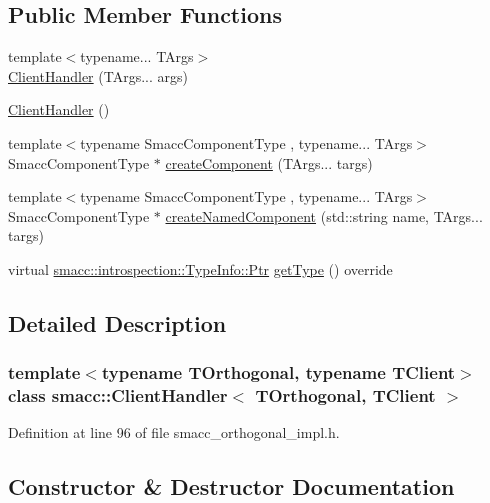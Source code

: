 \subsection*{Public Member Functions}
\begin{DoxyCompactItemize}
\item 
{\footnotesize template$<$typename... T\+Args$>$ }\\\hyperlink{classsmacc_1_1ClientHandler_a5f92ec0fcc8bf24d2d5ef6eb60e987d7}{Client\+Handler} (T\+Args... args)
\item 
\hyperlink{classsmacc_1_1ClientHandler_a73f354900b489edacad7ccb411c272da}{Client\+Handler} ()
\item 
{\footnotesize template$<$typename Smacc\+Component\+Type , typename... T\+Args$>$ }\\Smacc\+Component\+Type $\ast$ \hyperlink{classsmacc_1_1ClientHandler_a4a9adad4c37104586c9b595d9030bb3c}{create\+Component} (T\+Args... targs)
\item 
{\footnotesize template$<$typename Smacc\+Component\+Type , typename... T\+Args$>$ }\\Smacc\+Component\+Type $\ast$ \hyperlink{classsmacc_1_1ClientHandler_a33f440a8e06038df0dd291d2ea278f39}{create\+Named\+Component} (std\+::string name, T\+Args... targs)
\item 
virtual \hyperlink{classsmacc_1_1introspection_1_1TypeInfo_aa6ffd9c39811d59f7c771941b7fad860}{smacc\+::introspection\+::\+Type\+Info\+::\+Ptr} \hyperlink{classsmacc_1_1ClientHandler_a018a50262de782c479414cf18daddac9}{get\+Type} () override
\end{DoxyCompactItemize}


\subsection{Detailed Description}
\subsubsection*{template$<$typename T\+Orthogonal, typename T\+Client$>$\newline
class smacc\+::\+Client\+Handler$<$ T\+Orthogonal, T\+Client $>$}



Definition at line 96 of file smacc\+\_\+orthogonal\+\_\+impl.\+h.



\subsection{Constructor \& Destructor Documentation}
\mbox{\label{classsmacc_1_1ClientHandler_a5f92ec0fcc8bf24d2d5ef6eb60e987d7}} 
